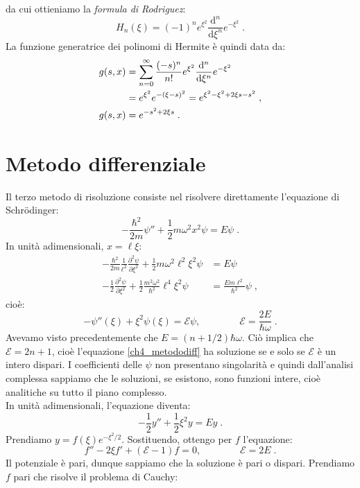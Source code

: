 \documentclass[12pt,a4paper]{report}
\theoremstyle{definition}
\newcommand{\pdev}[3][]{\frac{\partial^{#1} #2}{\partial #3^{#1}}}
\numberwithin{equation}{section}
\newcommand{\diff}[1][]{\mathrm{d}#1}
\newcommand{\Sch}{Schrödinger}
\begin{document}
da cui ottieniamo la \textit{formula di Rodriguez}:
\begin{equation}
H_n(\xi)=(-1)^n e^{\xi^2}\frac{\diff^n}{\diff{\xi}^n}e^{-\xi^2}\;.
\end{equation}
La funzione generatrice dei polinomi di Hermite è quindi data da:
\begin{align}
g(s,x)&=\sum_{n=0}^{\infty}\frac{(-s)^n}{n!}e^{\xi^2}\frac{\diff^n}{\diff{\xi}^n}e^{-\xi^2} \notag \\
&= e^{\xi^2}e^{-(\xi-s)^2}=e^{\xi^2-\xi^2+2\xi s-s^2}\;, \notag \\
g(s,x) &= e^{-s^2+2\xi s}\;.
\end{align}
\section{Metodo differenziale}
Il terzo metodo di risoluzione consiste nel risolvere direttamente l'equazione di \Sch:
\begin{equation}
-\frac{\hbar^2}{2m}\psi''+\frac{1}{2}m\omega^2x^2\psi=E\psi\;.
\end{equation}
In unità adimensionali, $x=\ell\xi$:
\begin{align*}
-\frac{\hbar^2}{2m}\frac{1}{\ell^2}\pdev[2]{\psi}{\xi}+\frac{1}{2}m\omega^2\ell^2\xi^2\psi&=E\psi \\
-\frac{1}{2}\pdev[2]{\psi}{\xi}+\frac{1}{2}\frac{m^2\omega^2}{\hbar^2}\ell^4\xi^2\psi&=\frac{Em\ell^2}{\hbar^2}\psi\;,
\end{align*}
cioè:
\begin{equation}
-\psi''(\xi)+\xi^2\psi(\xi)=\mathcal{E}\psi,\qquad \qquad \mathcal{E}=\frac{2E}{\hbar\omega}\;. \label{ch4_metododiff}
\end{equation}
Avevamo visto precedentemente che $E=(n+1/2)\hbar\omega$. Ciò implica che $\mathcal{E}=2n+1$, cioè l'equazione \eqref{ch4_metododiff} ha soluzione se e solo se $\mathcal{E}$ è un intero dispari. I coefficienti delle $\psi$ non presentano singolarità e quindi dall'analisi complessa sappiamo che le soluzioni, se esistono, sono funzioni intere, cioè analitiche su tutto il piano complesso. \\
In unità adimensionali, l'equazione diventa:
$$
-\frac{1}{2}y''+\frac{1}{2}\xi^2y=Ey\;.
$$
Prendiamo $y=f(\xi)e^{-\xi^2/2}$. Sostituendo, ottengo per $f$ l'equazione:
\begin{equation}
f''-2\xi f'+(\mathcal{E}-1)f=0,\qquad\qquad \mathcal{E}=2E\;.
\end{equation}
Il potenziale è pari, dunque sappiamo che la soluzione è pari o dispari. Prendiamo $f$ pari che risolve il problema di Cauchy:
\end{document}

